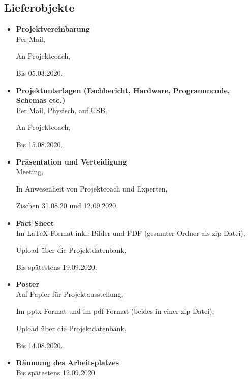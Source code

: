 \newpage

\subsection{Lieferobjekte}\label{subsec:Lieferobjekte}
\begin{itemize}

\item \textbf{Projektvereinbarung}\\

Per Mail,

An Projektcoach,

Bis 05.03.2020. \\

\item \textbf{Projektunterlagen (Fachbericht, Hardware, Programmcode, Schemas etc.)}\\

Per Mail, Physisch, auf USB,

An Projektcoach,

Bis 15.08.2020.\\

\item \textbf{Präsentation und Verteidigung}\\

Meeting,

In Anwesenheit von Projektcoach und Experten,

Zischen 31.08.20 und 12.09.2020.\\

\item \textbf{Fact Sheet}\\

Im LaTeX-Format inkl. Bilder und PDF (gesamter Ordner als zip-Datei),

Upload über die Projektdatenbank,

Bis spätestens 19.09.2020.\\

\item \textbf{Poster}\\

Auf Papier für Projektausstellung,

Im pptx-Format und im pdf-Format (beides in einer zip-Datei),

Upload über die Projektdatenbank,

Bis 14.08.2020.\\

\item \textbf{Räumung des Arbeitsplatzes}\\

Bis spätestens 12.09.2020


\end{itemize}	
